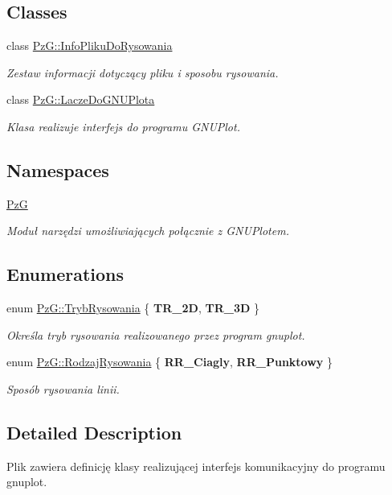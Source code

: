 \subsection*{Classes}
\begin{DoxyCompactItemize}
\item 
class \hyperlink{classPzG_1_1InfoPlikuDoRysowania}{Pz\+G\+::\+Info\+Pliku\+Do\+Rysowania}
\begin{DoxyCompactList}\small\item\em Zestaw informacji dotyczący pliku i sposobu rysowania. \end{DoxyCompactList}\item 
class \hyperlink{classPzG_1_1LaczeDoGNUPlota}{Pz\+G\+::\+Lacze\+Do\+G\+N\+U\+Plota}
\begin{DoxyCompactList}\small\item\em Klasa realizuje interfejs do programu G\+N\+U\+Plot. \end{DoxyCompactList}\end{DoxyCompactItemize}
\subsection*{Namespaces}
\begin{DoxyCompactItemize}
\item 
 \hyperlink{namespacePzG}{PzG}
\begin{DoxyCompactList}\small\item\em Moduł narzędzi umożliwiających połącznie z G\+N\+U\+Plotem. \end{DoxyCompactList}\end{DoxyCompactItemize}
\subsection*{Enumerations}
\begin{DoxyCompactItemize}
\item 
enum \hyperlink{namespacePzG_aeedae1ef10c66d720f9e89de408ca4ca}{Pz\+G\+::\+Tryb\+Rysowania} \{ {\bfseries T\+R\+\_\+2D}, 
{\bfseries T\+R\+\_\+3D}
 \}\begin{DoxyCompactList}\small\item\em Określa tryb rysowania realizowanego przez program {\ttfamily gnuplot}. \end{DoxyCompactList}
\item 
enum \hyperlink{namespacePzG_a705c92106f39b7d0c34a6739d10ff0b6}{Pz\+G\+::\+Rodzaj\+Rysowania} \{ {\bfseries R\+R\+\_\+\+Ciagly}, 
{\bfseries R\+R\+\_\+\+Punktowy}
 \}\begin{DoxyCompactList}\small\item\em Sposób rysowania linii. \end{DoxyCompactList}
\end{DoxyCompactItemize}


\subsection{Detailed Description}
Plik zawiera definicję klasy realizującej interfejs komunikacyjny do programu gnuplot. 